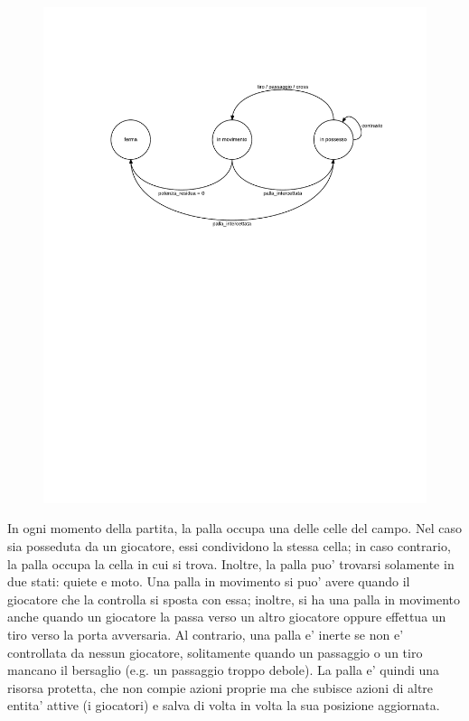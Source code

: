 \begin{figure}[htp!]
	\centering
	\includegraphics[scale=.8]{images/ball_state_diagram}
\end{figure}

In ogni momento della partita, la palla occupa una delle celle del campo. Nel caso sia posseduta da un giocatore, essi condividono la stessa cella; in caso contrario, la palla occupa la cella in cui si trova. Inoltre, la palla puo' trovarsi solamente in due stati: quiete e moto. Una palla in movimento si puo' avere quando il giocatore che la controlla si sposta con essa; inoltre, si ha una palla in movimento anche quando un giocatore la passa verso un altro giocatore oppure effettua un tiro verso la porta avversaria. Al contrario, una palla e' inerte se non e' controllata da nessun giocatore, solitamente quando un passaggio o un tiro mancano il bersaglio (e.g. un passaggio troppo debole). La palla e' quindi una risorsa protetta, che non compie azioni proprie ma che subisce azioni di altre entita' attive (i giocatori) e salva di volta in volta la sua posizione aggiornata.\\

